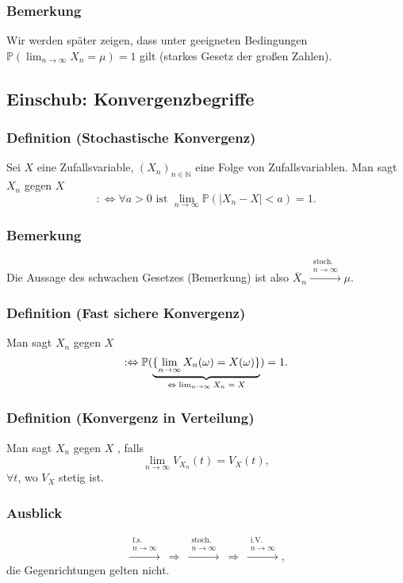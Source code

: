 \subsubsection{Bemerkung}
Wir werden sp\"ater zeigen, dass unter geeigneten Bedingungen $\mathbb{P}(\lim_{n\to\infty}X_n=\mu)=1$ gilt (starkes Gesetz der gro\ss{}en Zahlen).
\subsection{Einschub: Konvergenzbegriffe}
\subsubsection{Definition (Stochastische Konvergenz)}
Sei $X$ eine Zufallsvariable, $(X_n)_{n\in\mathbb{N}}$ eine Folge von Zufallsvariablen. Man sagt $X_n$  gegen $X$
\[
:\Leftrightarrow\forall a>0\text{ ist }\lim_{n\to\infty}\mathbb{P}(|X_n-X|<a)=1.
\]
\subsubsection{Bemerkung}
Die Aussage des schwachen Gesetzes (Bemerkung) ist also $\overline{X}_n\xrightarrow{\substack{\text{stoch.}\\n\to\infty}}\mu$.
\subsubsection{Definition (Fast sichere Konvergenz)}
Man sagt $X_n$  gegen $X$
\[
:\Leftrightarrow\mathbb{P}(\ubr{\{\lim_{n\to\infty}X_n(\omega)=X(\omega)\}}{$\Leftrightarrow\lim_{n\to\infty}X_n=X$})=1.
\]
\subsubsection{Definition (Konvergenz in Verteilung)}
Man sagt $X_n$  gegen $X$ , falls
\[
\lim_{n\to\infty}V_{X_n}(t)=V_X(t),
\]
$\forall t$, wo $V_X$ stetig ist.
\subsubsection{Ausblick}
\[
\xrightarrow{\substack{\text{f.s.}\\n\to\infty}}
\ \Rightarrow\ 
\xrightarrow{\substack{\text{stoch.}\\n\to\infty}}
\ \Rightarrow\ 
\xrightarrow{\substack{\text{i.V.}\\n\to\infty}},
\]
die Gegenrichtungen gelten nicht.
